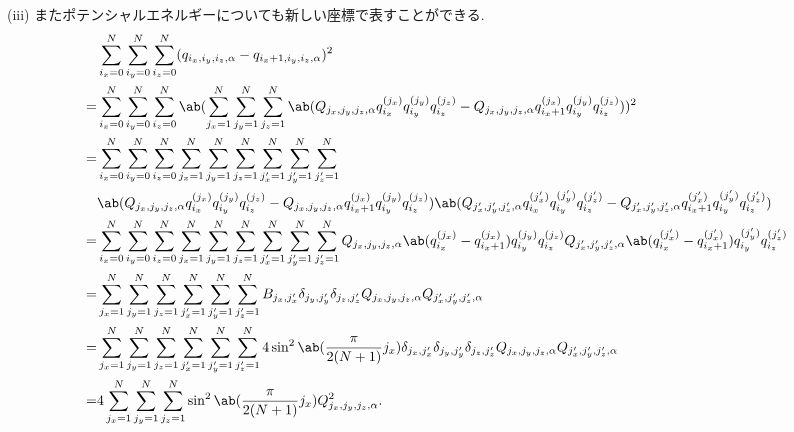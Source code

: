 \documentclass[uplatex,dvipdfmx,a4paper,11pt]{jlreq}
\numberwithin{equation}{section}
\theoremstyle{definition}
\begin{document}
(iii) またポテンシャルエネルギーについても新しい座標で表すことができる.
\begin{align}
    & \sum_{i_x=0}^{N}\sum_{i_y=0}^{N}\sum_{i_z=0}^{N}(q_{i_x,i_y,i_z,\alpha} - q_{i_x+1,i_y,i_z,\alpha})^2                                                                                                                                                                                                                                              \\
  = & \sum_{i_x=0}^{N}\sum_{i_y=0}^{N}\sum_{i_z=0}^{N}\ab(\sum_{j_x=1}^{N}\sum_{j_y=1}^{N}\sum_{j_z=1}^{N}\ab(Q_{j_x,j_y,j_z,\alpha}q_{i_x}^{(j_x)}q_{i_y}^{(j_y)}q_{i_z}^{(j_z)} - Q_{j_x,j_y,j_z,\alpha}q_{i_x+1}^{(j_x)}q_{i_y}^{(j_y)}q_{i_z}^{(j_z)}))^2                                                                                            \\
  = & \sum_{i_x=0}^{N}\sum_{i_y=0}^{N}\sum_{i_z=0}^{N}\sum_{j_x=1}^{N}\sum_{j_y=1}^{N}\sum_{j_z=1}^{N}\sum_{j_x'=1}^{N}\sum_{j_y'=1}^{N}\sum_{j_z'=1}^{N}                                                                                                                                                                                                \\
    & \ab(Q_{j_x,j_y,j_z,\alpha}q_{i_x}^{(j_x)}q_{i_y}^{(j_y)}q_{i_z}^{(j_z)} - Q_{j_x,j_y,j_z,\alpha}q_{i_x+1}^{(j_x)}q_{i_y}^{(j_y)}q_{i_z}^{(j_z)})\ab(Q_{j_x',j_y',j_z',\alpha}q_{i_x}^{(j_x')}q_{i_y}^{(j_y')}q_{i_z}^{(j_z')} - Q_{j_x',j_y',j_z',\alpha}q_{i_x+1}^{(j_x')}q_{i_y}^{(j_y')}q_{i_z}^{(j_z')})                                       \\
  = & \sum_{i_x=0}^{N}\sum_{i_y=0}^{N}\sum_{i_z=0}^{N}\sum_{j_x=1}^{N}\sum_{j_y=1}^{N}\sum_{j_z=1}^{N}\sum_{j_x'=1}^{N}\sum_{j_y'=1}^{N}\sum_{j_z'=1}^{N}Q_{j_x,j_y,j_z,\alpha}\ab(q_{i_x}^{(j_x)} - q_{i_x+1}^{(j_x)})q_{i_y}^{(j_y)}q_{i_z}^{(j_z)}Q_{j_x',j_y',j_z',\alpha}\ab(q_{i_x}^{(j_x')} - q_{i_x+1}^{(j_x')})q_{i_y}^{(j_y')}q_{i_z}^{(j_z')} \\
  = & \sum_{j_x=1}^{N}\sum_{j_y=1}^{N}\sum_{j_z=1}^{N}\sum_{j_x'=1}^{N}\sum_{j_y'=1}^{N}\sum_{j_z'=1}^{N}B_{j_x,j_x'}\delta_{j_y,j_y'}\delta_{j_z,j_z'}Q_{j_x,j_y,j_z,\alpha}Q_{j_x',j_y',j_z',\alpha}                                                                                                                                                   \\
  = & \sum_{j_x=1}^{N}\sum_{j_y=1}^{N}\sum_{j_z=1}^{N}\sum_{j_x'=1}^{N}\sum_{j_y'=1}^{N}\sum_{j_z'=1}^{N}4\sin^2\ab(\frac{\pi}{2(N+1)}j_x)\delta_{j_x,j_x'}\delta_{j_y,j_y'}\delta_{j_z,j_z'}Q_{j_x,j_y,j_z,\alpha}Q_{j_x',j_y',j_z',\alpha}                                                                                                             \\
  = & 4\sum_{j_x=1}^{N}\sum_{j_y=1}^{N}\sum_{j_z=1}^{N}\sin^2\ab(\frac{\pi}{2(N+1)}j_x)Q_{j_x,j_y,j_z,\alpha}^2.
\end{align}
\end{document}
